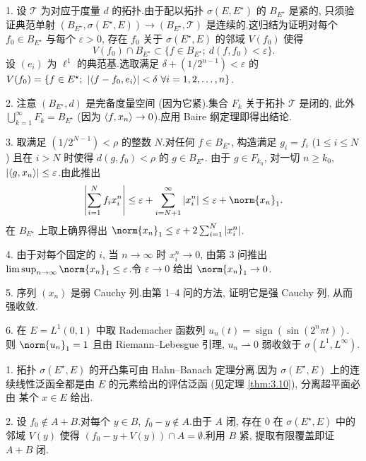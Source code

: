 
1. 设 $\mathcal{T}$ 为对应于度量 $d$ 的拓扑.由于配以拓扑 $\sigma(E,E^\star)$ 的
$B_{E^\star}$ 是紧的, 只须验证典范单射 $(B_{E^\star},\sigma(E^\star,E))\to(B_{E^\star},\mathcal{T})$
是连续的.这归结为证明对每个 $f_0\in B_{E^\star}$ 与每个 $\varepsilon>0$, 存在
$f_0$ 关于 $\sigma(E^\star,E)$ 的邻域 $V(f_0)$ 使得
\begin{equation*}
V(f_0)\cap B_{E^\star}\subset\{f\in B_{E^\star};\ d(f,f_0)<\varepsilon\}.
\end{equation*}
设 $(e_i)$ 为 $\ell^1$ 的典范基.选取满足 $\delta+(1/2^{n-1})<\varepsilon$ 的
$V(f_0)=\{f\in E^\star;\ \abs{\dual{f-f_0}{e_i}}<\delta\ \forall i=1,2,\dots,n\}$.

2. 注意 $(B_{E^\star},d)$ 是完备度量空间 (因为它紧).集合 $F_k$ 关于拓扑 $\mathcal{T}$
是闭的, 此外 $\bigcup_{k=1}^\infty F_k=B_{E^\star}$ (因为 $\left\langle f,x_n\right\rangle\to0$).应用
Baire 纲定理即得出结论.

3. 取满足 $(1/2^{N-1})<\rho$ 的整数 $N$.对任何 $f\in B_{E^\star}$, 构造满足
$g_i=f_i$ ($1\le i\le N$) 且在 $i>N$ 时使得 $d(g,f_0)<\rho$ 的 $g\in B_{E^\star}$.
由于 $g\in F_{k_0}$, 对一切 $n\ge k_0$, $\left|\left\langle g,x_n\right\rangle\right|\le\varepsilon$.由此推出
\begin{equation*}
\abs{\sum_{i=1}^Nf_ix_i^n}\le\varepsilon+\sum_{i=N+1}^\infty\abs{x_i^n}\le\varepsilon+\norm{x_n}_1.
\end{equation*}
在 $B_{E^\star}$ 上取上确界得出 $\norm{x_n}_1\le\varepsilon+2\sum_{i=1}^N\abs{x_i^n}$.

4. 由于对每个固定的 $i$, 当 $n\to\infty$ 时 $x_i^n\to0$, 由第 3 问推出
$\limsup_{n\to\infty}\norm{x_n}_1\le\varepsilon$.令 $\varepsilon\to0$ 给出 $\norm{x_n}_1\to0$.

5. 序列 $(x_n)$ 是弱 Cauchy 列.由第 1--4 问的方法, 证明它是强 Cauchy 列, 从而强收敛.

6. 在 $E=L^1(0,1)$ 中取 Rademacher 函数列 $u_n(t)=\operatorname{sign}(\sin(2^n\pi t))$.
则 $\norm{u_n}_1=1$ 且由 Riemann--Lebesgue 引理, $u_n\rightharpoonup0$ 弱收敛于 $\sigma(L^1,L^\infty)$.



1. 拓扑 $\sigma(E^\star,E)$ 的开凸集可由 Hahn--Banach 定理分离.因为 $\sigma(E^\star,E)$
上的连续线性泛函全都是由 $E$ 的元素给出的评估泛函 (见定理  \ref{thm:3.10}), 分离超平面必由
某个 $x\in E$ 给出.

2. 设 $f_0\notin A+B$.对每个 $y\in B$, $f_0-y\notin A$.由于 $A$ 闭, 存在 $0$ 在
$\sigma(E^\star,E)$ 中的邻域 $V(y)$ 使得 $(f_0-y+V(y))\cap A=\emptyset$.利用 $B$ 紧,
提取有限覆盖即证 $A+B$ 闭.

